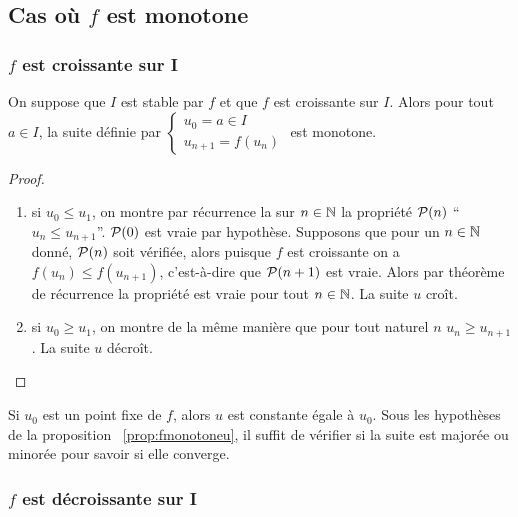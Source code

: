 \subsection{Cas où \(f\) est monotone}

\subsubsection{\(f\) est croissante sur I}

\begin{prop}\label{prop:fmonotoneu}
  On suppose que \(I\) est stable par \(f\) et que \(f\) est croissante sur 
  \(I\). Alors pour tout \(a \in I\), la suite définie par \(\begin{cases} u_0=a 
  \in I \\ u_{n+1}=f(u_n) \end{cases}\) est monotone.
\end{prop}
\begin{proof}
  \begin{enumerate}
    \item si \(u_0 \leqslant u_1\), on montre par récurrence la sur \(n \in \N\) 
      la propriété \(\P(n)\) ``\(u_n \leqslant u_{n+1}\)''. \(\P(0)\) est vraie 
      par hypothèse. Supposons que pour un \(n \in \N\) donné, \(\P(n)\) soit 
      vérifiée, alors puisque \(f\) est croissante on a \(f(u_n) \leqslant 
      f(u_{n+1})\), c'est-à-dire que \(\P(n+1)\) est vraie. Alors par théorème 
      de récurrence la propriété est vraie pour tout \(n \in \N\). La suite 
      \(u\) croît.
    \item si \(u_0 \geqslant u_1\), on montre de la même manière que pour tout 
      naturel \(n\) \(u_n \geqslant u_{n+1}\). La suite \(u\) décroît.
  \end{enumerate}
\end{proof}

Si \(u_0\) est un point fixe de \(f\), alors \(u\) est constante égale à 
\(u_0\). Sous les hypothèses de la proposition~
\ref{prop:fmonotoneu}, il suffit de vérifier si la suite est majorée ou minorée 
pour savoir si elle converge.

\subsubsection{\(f\) est décroissante sur I}

